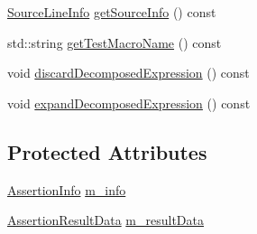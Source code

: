 \begin{DoxyCompactItemize}
\item 
\hyperlink{struct_catch_1_1_source_line_info}{Source\-Line\-Info} \hyperlink{class_catch_1_1_assertion_result_a68b73fe982a97fe6432af679af1a2dad}{get\-Source\-Info} () const 
\item 
std\-::string \hyperlink{class_catch_1_1_assertion_result_a2901d41b199258ff6a44571b147169dd}{get\-Test\-Macro\-Name} () const 
\item 
void \hyperlink{class_catch_1_1_assertion_result_a99ab3067eb758c3fecdee8d8ff2beae6}{discard\-Decomposed\-Expression} () const 
\item 
void \hyperlink{class_catch_1_1_assertion_result_a53e8c2ce444fc9353a4e54c9233ef527}{expand\-Decomposed\-Expression} () const 
\end{DoxyCompactItemize}
\subsection*{Protected Attributes}
\begin{DoxyCompactItemize}
\item 
\hyperlink{struct_catch_1_1_assertion_info}{Assertion\-Info} \hyperlink{class_catch_1_1_assertion_result_a3e7236f73a51d6fc8bb9dfdefcee7772}{m\-\_\-info}
\item 
\hyperlink{struct_catch_1_1_assertion_result_data}{Assertion\-Result\-Data} \hyperlink{class_catch_1_1_assertion_result_add3455b8bbedb0d643e18da67c66b4f7}{m\-\_\-result\-Data}
\end{DoxyCompactItemize}


